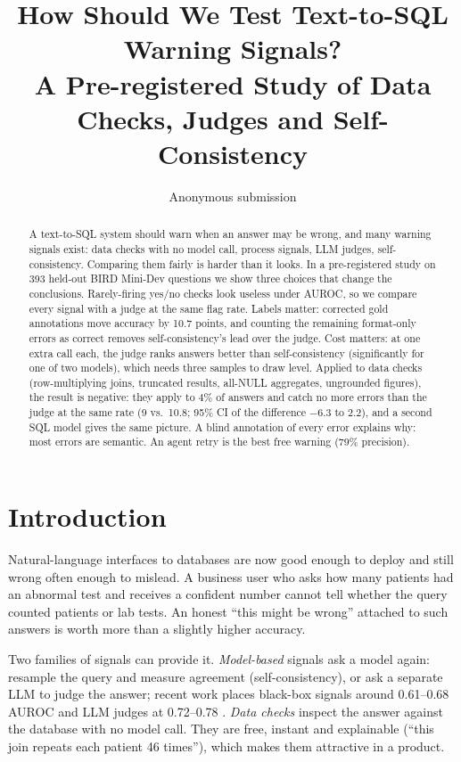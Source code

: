 \documentclass[10pt,twocolumn]{article}
\title{\Large How Should We Test Text-to-SQL Warning Signals?\\
A Pre-registered Study of Data Checks, Judges and Self-Consistency}
\author{Anonymous submission}
\date{}
\begin{document}
\maketitle

\begin{abstract}
A text-to-SQL system should warn when an answer may be wrong, and many warning signals exist: data
checks with no model call, process signals, LLM judges, self-consistency. Comparing them fairly is
harder than it looks. In a pre-registered study on 393 held-out BIRD Mini-Dev questions we show three
choices that change the conclusions. Rarely-firing yes/no checks look useless under AUROC, so we
compare every signal with a judge at the same flag rate. Labels matter: corrected gold annotations
move accuracy by 10.7 points, and counting the remaining format-only errors as correct removes
self-consistency's lead over the judge. Cost matters: at one extra call each, the judge ranks answers
better than self-consistency (significantly for one of two models), which needs three samples to
draw level. Applied to data checks (row-multiplying
joins, truncated results, all-NULL aggregates, ungrounded figures), the result is negative: they apply
to 4\% of answers and catch no more errors than the judge at the same rate (9 vs.\ 10.8; 95\% CI of
the difference $-6.3$ to $2.2$), and a second SQL model gives the same picture. A blind annotation of
every error explains why: most errors are semantic. An agent retry is the best free warning (79\%
precision).
\end{abstract}

\section{Introduction}

Natural-language interfaces to databases are now good enough to deploy and still wrong often enough
to mislead. A business user who asks how many patients had an abnormal test and receives a confident
number cannot tell whether the query counted patients or lab tests. An honest ``this might be wrong''
attached to such answers is worth more than a slightly higher accuracy.

Two families of signals can provide it. \emph{Model-based} signals ask a model again: resample the
query and measure agreement (self-consistency), or ask a separate LLM to judge the answer; recent work
places black-box signals around 0.61--0.68 AUROC and LLM judges at 0.72--0.78
\citep{richardson2026predicts}. \emph{Data checks} inspect the answer against the database with no
model call. They are free, instant and explainable (``this join repeats each patient 46 times''),
which makes them attractive in a product.
\end{document}
